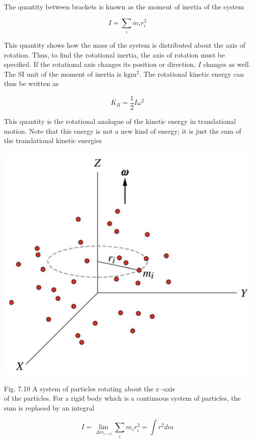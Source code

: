 \documentclass[10pt]{article}
\begin{document}
The quantity between brackets is known as the moment of inertia of the system

$$
I=\sum_{i} m_{i} r_{i}^{2}
$$

This quantity shows how the mass of the system is distributed about the axis of rotation. Thus, to find the rotational inertia, the axis of rotation must be specified. If the rotational axis changes its position or direction, $I$ changes as well. The SI unit of the moment of inertia is $\mathrm{kg} \mathrm{m}^{2}$. The rotational kinetic energy can thus be written as

$$
K_{R}=\frac{1}{2} I \omega^{2}
$$

This quantity is the rotational analogue of the kinetic energy in translational motion. Note that this energy is not a new kind of energy; it is just the sum of the translational kinetic energies

\begin{center}
\includegraphics[max width=\textwidth]{2024_09_13_db1f357d2aad0a03eb2eg-117(1)}
\end{center}

Fig. 7.10 A system of particles rotating about the z -axis\\
of the particles. For a rigid body which is a continuous system of particles, the sum is replaced by an integral

$$
I=\lim _{\Delta m_{\mathrm{i} \rightarrow 0}} \sum_{i} m_{i} r_{i}^{2}=\int r^{2} d m
$$
\end{document}
